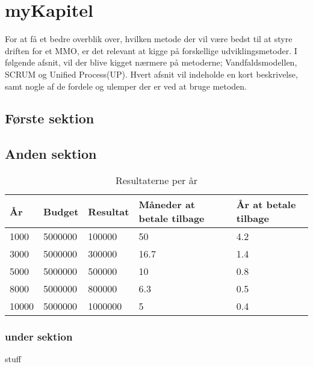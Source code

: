 \cfoot{\page\textbackslash \totalp} %
\chapter{myKapitel}
For at få et bedre overblik over, hvilken metode der vil være bedst til at styre driften for et MMO, er det relevant at kigge på forskellige udviklingsmetoder. I følgende afsnit, vil der blive kigget nærmere på metoderne; Vandfaldsmodellen, SCRUM og Unified Process(UP). Hvert afsnit vil indeholde en kort beskrivelse, samt nogle af de fordele og ulemper der er ved at bruge metoden.\\
\section{Første sektion}


\section{Anden sektion}

\begin{table}
\begin{center}
\begin{tabularx}{0.75\textwidth}{|X|X|X|X|X|}
\hline
År & Budget & Resultat & Måneder at betale tilbage & År at betale tilbage \\ \hline \hline
1000 & 5000000 & 100000 & 50 & 4.2 \\ \hline
3000 & 5000000 & 300000 & 16.7 & 1.4 \\ \hline
5000 & 5000000 & 500000 & 10 & 0.8 \\ \hline
8000 & 5000000 & 800000 & 6.3 & 0.5 \\ \hline
10000 & 5000000 & 1000000 & 5 & 0.4 \\ \hline
\end{tabularx}
\end{center}
\caption{Resultaterne per år}
\end{table}

\subsection{under sektion}

\cite{HTL}stuff

